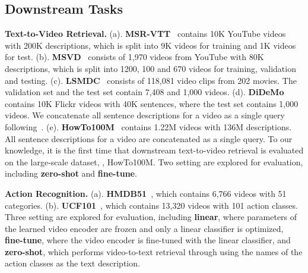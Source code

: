 \documentclass[10pt,twocolumn,letterpaper]{article}
\begin{document}
\subsection{Downstream Tasks}
{\flushleft \bf Text-to-Video Retrieval.} (a). \textbf{MSR-VTT}~\cite{msr} contains 10K YouTube videos with 200K
descriptions, which is split into 9K videos for training and 1K videos for test.
(b). \textbf{MSVD}~\cite{msvd} consists of 1,970 videos from YouTube with 80K descriptions, which is split into 1200, 100 and 670 videos for training, validation and testing.
(c). \textbf{LSMDC}~\cite{lsmdc} consists of 118,081 video clips from 202 movies. The validation set and the test set contain 7,408 and 1,000 videos. 
(d). \textbf{DiDeMo}~\cite{didemo} contains 10K Flickr videos with 40K sentences, where the test set contains 1,000 videos. We concatenate all sentence descriptions for a video as a single query following~\cite{frozen}.
(e). \textbf{HowTo100M}~\cite{howto100m} contains 1.22M videos with 136M descriptions. All sentence descriptions for a video are concatenated as a single query. To our knowledge, it is the first time that downstream text-to-video retrieval is evaluated on the large-scale dataset, \ie, HowTo100M. 
Two setting are explored for evaluation, including \textbf{zero-shot} and \textbf{fine-tune}.

{\flushleft \bf Action Recognition.}
(a). \textbf{HMDB51}~\cite{hmdb}, which contains 6,766 videos with 51 categories.
(b). \textbf{UCF101}~\cite{ucf}, which contains 13,320 videos with 101 action classes. 
Three setting are explored for evaluation, including \textbf{linear}, where parameters of the learned video encoder are frozen and only a linear classifier is optimized, \textbf{fine-tune}, where the video encoder is fine-tuned with the linear classifier, and \textbf{zero-shot}, which performs video-to-text retrieval through using the names of the action classes as the text description.
\end{document}
